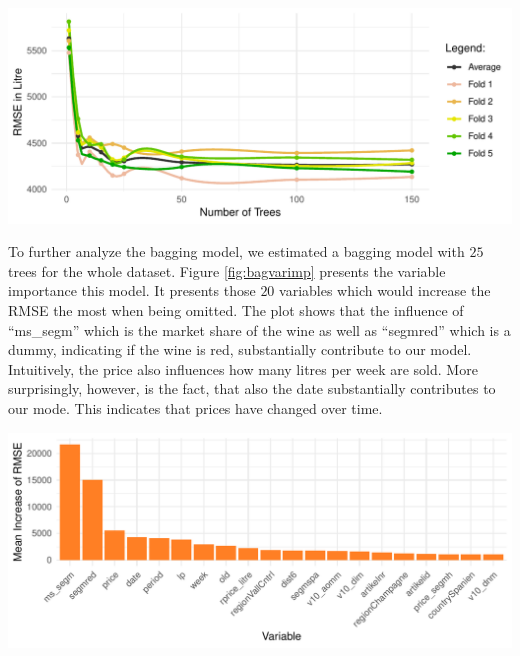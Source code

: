 \documentclass[11pt,]{article}
\let\origfigure\figure
\let\endorigfigure\endfigure
\renewenvironment{figure}[1][2] {
    \expandafter\origfigure\expandafter[H]
} {
    \endorigfigure
}
\begin{document}
\begin{figure}

\includegraphics{../00_data/output_paper/14_bagging} \hfill{}

\caption[Bagging: RMSEs at Different Tree Sizes]{\label{fig:rmsebag}Bagging: RMSEs at Different Tree Sizes (Smoothed).}\label{fig:bag}
\end{figure}

To further analyze the \ac{bagging} model, we estimated a \ac{bagging}
model with \(25\) trees for the whole dataset. Figure
\ref{fig:bagvarimp} presents the variable importance this model. It
presents those \(20\) variables which would increase the \ac{RMSE} the
most when being omitted. The plot shows that the influence of
\enquote{ms\_segm} which is the market share of the wine as well as
\enquote{segmred} which is a dummy, indicating if the wine is red,
substantially contribute to our model. Intuitively, the price also
influences how many litres per week are sold. More surprisingly,
however, is the fact, that also the date substantially contributes to
our mode. This indicates that prices have changed over time.

\begin{figure}

\includegraphics{../00_data/output_paper/15_var_imp_bagging} \hfill{}

\caption{\label{fig:bagvarimp}Bagging: Variable Importance.}\label{fig:bag_varimp}
\end{figure}
\end{document}
